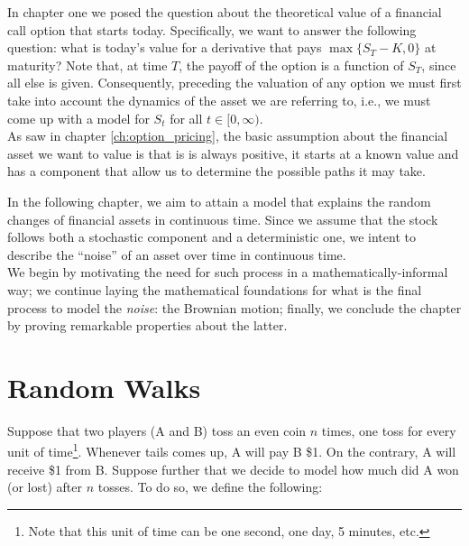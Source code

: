 \documentclass[../TGMAFFIRO]{subfiles}
\begin{document}
	



In chapter one we posed the question about the theoretical value of a financial call option that starts today. Specifically, we want to answer the following question: what is today's value for a derivative that pays $\max\{S_T-K, 0\}$ at maturity? Note that, at time $T$, the payoff of the option is a function of $S_T$, since all else is given. Consequently, preceding the valuation of any option we must first take into account the dynamics of the asset we are referring to, i.e., we must come up with a model for $S_t$ for all $t \in [0,\infty)$.\\

As saw in chapter \ref{ch:option_pricing}, the basic assumption about the financial asset we want to value is that is is always positive, it starts at a known value and has a component that allow us to determine the possible paths it may take.

In the following chapter, we aim to attain a model that explains the random changes of financial assets in continuous time. Since we assume that the stock follows both a stochastic component and a deterministic one, we intent to describe the ``noise'' of an asset over time in continuous time.\\

We begin by motivating the need for such process in a mathematically-informal way; we continue laying the mathematical foundations for what is the final process to model the \textit{noise}: the Brownian motion; finally, we conclude the chapter by proving remarkable properties about the latter.

\section{Random Walks}
Suppose that two players (A and B) toss an even coin $n$ times, one toss for every unit of time\footnote{Note that this unit of time can be one second, one day, 5 minutes, etc.}. Whenever tails comes up, A will pay B \$1. On the contrary, A will receive \$1 from B. Suppose further that we decide to model how much did A won (or lost) after $n$ tosses. To do so, we define the following:
\end{document}

